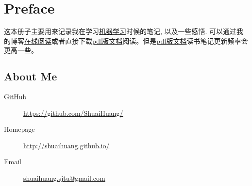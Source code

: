\chapter*{Preface}

这本册子主要用来记录我在学习\href{https://www.amazon.cn/dp/B01ARKEV1G/}{机器学习}时候的笔记, 以及一些感悟. 可以通过我的博客\href{http://shuaihuang.github.io/Notes/}{在线阅读}或者直接下载\href{https://github.com/ShuaiHuang/MachineLearningNotes/blob/LaTexDraft/Machine-Learning-Reading-Note.pdf}{pdf版文档}阅读。但是\href{https://github.com/ShuaiHuang/MachineLearningNotes/blob/LaTexDraft/Machine-Learning-Reading-Note.pdf}{pdf版文档}读书笔记更新频率会更高一些。

\section*{About Me}

\begin{description}
    \item[GitHub] \href{https://github.com/ShuaiHuang/}{https://github.com/ShuaiHuang/}
    \item[Homepage] \href{http://shuaihuang.github.io/}{http://shuaihuang.github.io/}
    \item[Email] \href{mailto:shuaihuang.sjtu@gmail.com}{shuaihuang.sjtu@gmail.com}
\end{description}